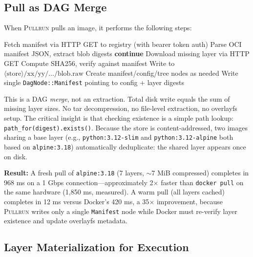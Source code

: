 \documentclass[11pt,a4paper]{article}
\newcommand{\pullrun}{\textsc{Pullrun}}
\begin{document}
\subsection{Pull as DAG Merge}\label{sec:pull-merge}

When \pullrun{} pulls an image, it performs the following steps:

\begin{algorithm}[H]
\caption{OCI Image Pull as DAG Merge}
\label{alg:pull}
\begin{algorithmic}[1]
\State Fetch manifest via HTTP GET to registry (with bearer token auth)
\State Parse OCI manifest JSON, extract blob digests
        \State \textbf{continue} 
    \EndIf
    \State Download missing layer via HTTP GET
    \State Compute SHA256, verify against manifest
    \State Write to $\langle\text{store}\rangle/\text{xx}/\text{yy}/\ldots/\text{blob.raw}$
    \State Create manifest/config/tree nodes as needed
\EndFor
\State Write single \texttt{DagNode::Manifest} pointing to config + layer digests
\end{algorithmic}
\end{algorithm}

This is a DAG \emph{merge}, not an extraction. Total disk write equals the sum of missing layer sizes. No tar decompression, no file-level extraction, no overlayfs setup. The critical insight is that checking existence is a simple path lookup: \texttt{path\_for(digest).exists()}. Because the store is content-addressed, two images sharing a base layer (e.g., \texttt{python:3.12-slim} and \texttt{python:3.12-alpine} both based on \texttt{alpine:3.18}) automatically deduplicate: the shared layer appears once on disk.

\textbf{Result:} A fresh pull of \texttt{alpine:3.18} (7 layers, $\sim$7 MiB compressed) completes in 968 ms on a 1 Gbps connection---approximately 2$\times$ faster than \texttt{docker pull} on the same hardware (1,850 ms, measured). A warm pull (all layers cached) completes in 12 ms versus Docker's 420 ms, a 35$\times$ improvement, because \pullrun{} writes only a single \texttt{Manifest} node while Docker must re-verify layer existence and update overlayfs metadata.

\subsection{Layer Materialization for Execution}
\end{document}
